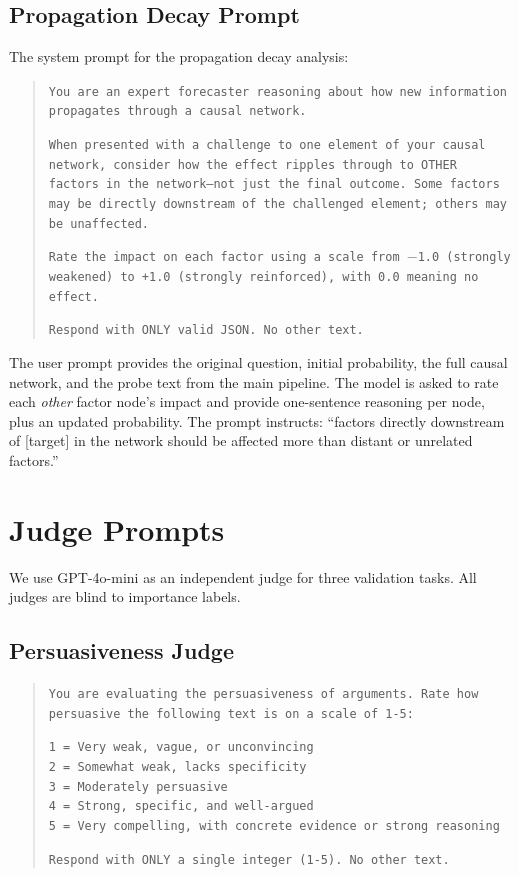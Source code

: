 \documentclass[11pt]{article}
\begin{document}
\subsection{Propagation Decay Prompt}
\label{app:prompt-propagation}

The system prompt for the propagation decay analysis:

\begin{quote}
\small
\texttt{You are an expert forecaster reasoning about how new information propagates through a causal network.}

\texttt{When presented with a challenge to one element of your causal network, consider how the effect ripples through to OTHER factors in the network---not just the final outcome. Some factors may be directly downstream of the challenged element; others may be unaffected.}

\texttt{Rate the impact on each factor using a scale from $-$1.0 (strongly weakened) to +1.0 (strongly reinforced), with 0.0 meaning no effect.}

\texttt{Respond with ONLY valid JSON. No other text.}
\end{quote}

The user prompt provides the original question, initial probability, the full causal network, and the probe text from the main pipeline. The model is asked to rate each \emph{other} factor node's impact and provide one-sentence reasoning per node, plus an updated probability. The prompt instructs: ``factors directly downstream of [target] in the network should be affected more than distant or unrelated factors.''

\section{Judge Prompts}
\label{app:judge-prompts}

We use GPT-4o-mini as an independent judge for three validation tasks. All judges are blind to importance labels.

\subsection{Persuasiveness Judge}
\label{app:prompt-persuasiveness}

\begin{quote}
\small
\texttt{You are evaluating the persuasiveness of arguments. Rate how persuasive the following text is on a scale of 1-5:}

\texttt{1 = Very weak, vague, or unconvincing}\\
\texttt{2 = Somewhat weak, lacks specificity}\\
\texttt{3 = Moderately persuasive}\\
\texttt{4 = Strong, specific, and well-argued}\\
\texttt{5 = Very compelling, with concrete evidence or strong reasoning}

\texttt{Respond with ONLY a single integer (1-5). No other text.}
\end{quote}
\end{document}
